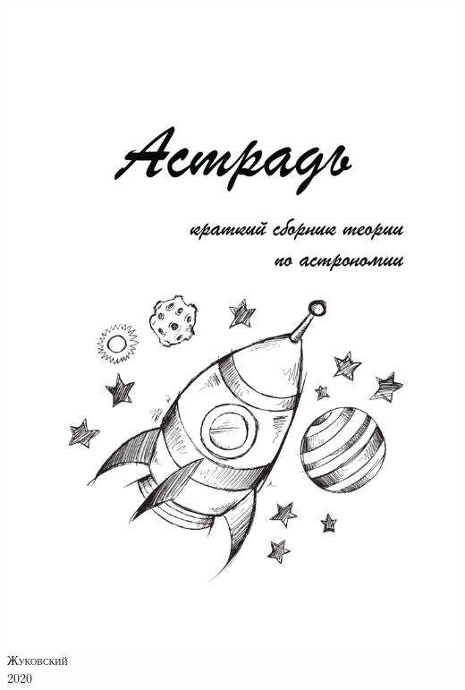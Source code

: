 \newpage
\thispagestyle{empty}
\begin{center}
\includegraphics[width=0.95\tw]{sys/cover.pdf}\\[1pc]
{\scshape Жуковский \\ 2020}	
\end{center}

